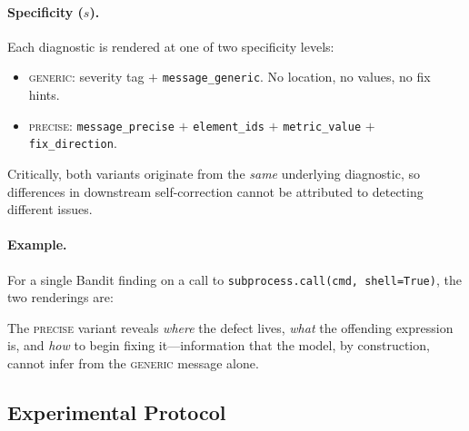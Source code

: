 \paragraph{Specificity ($s$).}
Each diagnostic is rendered at one of two specificity levels:
\begin{itemize}
    \item \textsc{generic}: severity tag $+$ \texttt{message\_generic}. No location, no values, no fix hints.
    \item \textsc{precise}: \texttt{message\_precise} $+$ \texttt{element\_ids} $+$ \texttt{metric\_value} $+$ \texttt{fix\_direction}.
\end{itemize}
Critically, both variants originate from the \emph{same} underlying diagnostic, so differences in downstream self-correction cannot be attributed to detecting different issues.

\paragraph{Example.}
For a single Bandit finding on a call to \texttt{subprocess.call(cmd, shell=True)}, the two renderings are:

\smallskip
\noindent{}

\smallskip
\noindent{}

\smallskip
The \textsc{precise} variant reveals \emph{where} the defect lives, \emph{what} the offending expression is, and \emph{how} to begin fixing it---information that the model, by construction, cannot infer from the \textsc{generic} message alone.

\subsection{Experimental Protocol}
\label{sec:protocol}

